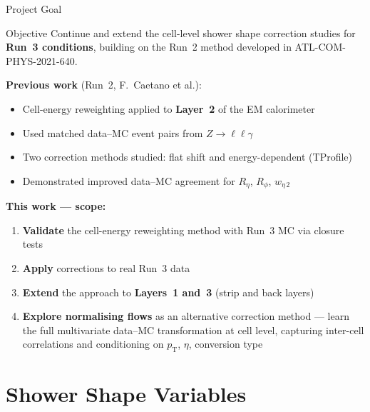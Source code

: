 \documentclass[aspectratio=169,10pt]{beamer}
\begin{document}
\begin{frame}{Project Goal}

\begin{block}{Objective}
Continue and extend the cell-level shower shape correction studies
for \textbf{Run~3 conditions}, building on the Run~2 method
developed in ATL-COM-PHYS-2021-640.
\end{block}
\vspace{4pt}

\textbf{Previous work} (Run~2, F.~Caetano et al.):
\begin{itemize}
  \item Cell-energy reweighting applied to \textbf{Layer~2} of the EM calorimeter
  \item Used matched data--MC event pairs from $Z\to\ell\ell\gamma$
  \item Two correction methods studied: flat shift and energy-dependent (TProfile)
  \item Demonstrated improved data--MC agreement for $R_\eta$, $R_\phi$,
        $w_{\eta\,2}$
\end{itemize}
\vspace{4pt}

\textbf{This work — scope:}
\begin{enumerate}
  \item \textbf{Validate} the cell-energy reweighting method with Run~3 MC
        via closure tests
  \item \textbf{Apply} corrections to real Run~3 data
  \item \textbf{Extend} the approach to \textbf{Layers~1 and~3}
        (strip and back layers)
  \item \textbf{Explore normalising flows} as an alternative correction
        method — learn the full multivariate data--MC transformation
        at cell level, capturing inter-cell correlations and
        conditioning on $p_\text{T}$, $\eta$, conversion type
\end{enumerate}
\end{frame}

\section{Shower Shape Variables}
\end{document}
